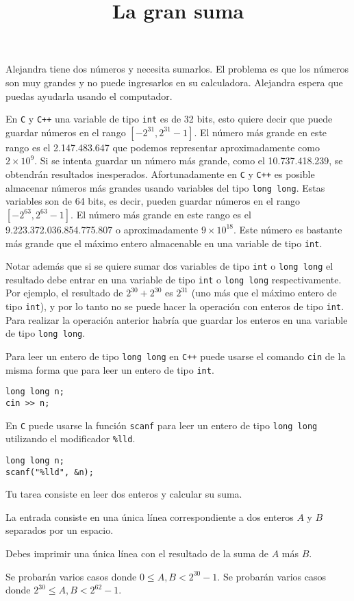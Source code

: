 \documentclass{oci}
\title{La gran suma}
\newcommand{\C}{\texttt{C}\xspace}
\newcommand{\Cpp}{\texttt{C++}\xspace}
\newcommand{\Int}{\texttt{int}\xspace}
\newcommand{\Long}{\texttt{long long}\xspace}
\newcommand{\cin}{\texttt{cin}\xspace}
\newcommand{\scanf}{\texttt{scanf}\xspace}
\begin{document}
\begin{problemDescription}
  Alejandra tiene dos números y necesita sumarlos.
El problema es que los números son muy grandes y no puede ingresarlos en su calculadora.
Alejandra espera que puedas ayudarla usando el computador.

En \C y \Cpp una variable de tipo \Int es de 32 bits, esto quiere decir que puede guardar números en el rango $[-2^{31}, 2^{31}-1]$.
El número más grande en este rango es el 2.147.483.647 que podemos representar aproximadamente como $2\times 10^9$.
Si se intenta guardar un número más grande, como el 10.737.418.239, se obtendrán resultados inesperados.
Afortunadamente en \C y \Cpp es posible almacenar números más grandes usando variables del tipo \Long.
Estas variables son de 64 bits, es decir, pueden guardar números en el rango $[-2^{63}, 2^{63}-1]$.
El número más grande en este rango es el 9.223.372.036.854.775.807 o aproximadamente $9\times 10^{18}$.
Este número es bastante más grande que el máximo entero almacenable en una variable de tipo \Int.

Notar además que si se quiere sumar dos variables de tipo \Int o \Long el resultado debe entrar en una variable de tipo \Int o \Long respectivamente.
Por ejemplo, el resultado de $2^{30}+2^{30}$ es $2^{31}$ (uno más que el máximo entero de tipo \Int), y por lo tanto no se puede hacer la operación con enteros de tipo \Int.
Para realizar la operación anterior habría que guardar los enteros en una variable de tipo \Long.

Para leer un entero de tipo \Long en \Cpp puede usarse el comando \cin de la misma forma que para leer un entero de tipo \Int.
\begin{verbatim}
long long n;
cin >> n;
\end{verbatim}

En \C puede usarse la función \scanf para leer un entero de tipo \Long utilizando el modificador \texttt{\%lld}.
\begin{verbatim}
long long n;
scanf("%lld", &n);
\end{verbatim}

Tu tarea consiste en leer dos enteros y calcular su suma.
  
\end{problemDescription}

\begin{inputDescription}
  La entrada consiste en una única línea correspondiente a dos enteros $A$ y $B$ separados por un espacio.
\end{inputDescription}

\begin{outputDescription}
  Debes imprimir una única línea con el resultado de la suma de $A$ más $B$.
\end{outputDescription}

\begin{scoreDescription}
   Se probarán varios casos donde $0\leq A,B < 2^{30}-1$.
   Se probarán varios casos donde $2^{30}\leq A,B < 2^{62}-1$.
\end{scoreDescription}

\begin{sampleDescription}
\end{sampleDescription}
\end{document}
